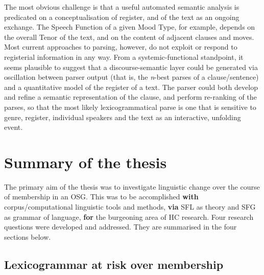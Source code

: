 The most obvious challenge is that a useful automated semantic analysis is predicated on a conceptualisation of register, and of the text as an ongoing exchange. The Speech Function of a given Mood Type, for example, depends on the overall Tenor of the text, and on the content of adjacent clauses and moves. Most current approaches to parsing, however, do not exploit or respond to registerial information in any way. From a systemic\hyp{}functional standpoint, it seems plausible to suggest that a \gls{discourse-semantic} layer could be generated via oscillation between parser output (that is, the \emph{n}\hyp{}best parses of a clause\slash sentence) and a quantitative model of the register of a text. The parser could both develop and refine a semantic representation of the clause, and perform re\hyp{}ranking of the parses, so that the most likely lexicogrammatical parse is one that is sensitive to genre, register, individual speakers and the text as an interactive, unfolding event.


\section{Summary of the thesis}

The primary aim of the thesis was to investigate linguistic change over the course of membership in an \gls{OSG}. This was to be accomplished \textbf{with} corpus\slash computational linguistic tools and methods, \textbf{via} \gls{SFL} as theory and \gls{SFG} as grammar of language, \textbf{for} the burgeoning area of \gls{HC} research. Four research questions were developed and addressed. They are summarised in the four sections below.

\subsection{Lexicogrammar at risk over membership}

